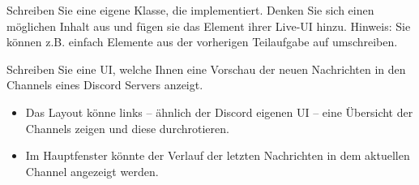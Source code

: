 \documentclass{config/minimal_uebungszettel}
\theoremstyle{definition}
\newcommand{\pp}[1]{\lpl{#1}}
\begin{document}
\begin{aufg}[Rich]
			  \noindent Schreiben Sie eine eigene Klasse, die \pp{__rich__} implementiert. Denken Sie sich einen möglichen Inhalt aus und fügen sie das Element ihrer Live-UI hinzu.\newline
			  Hinweis: Sie können z.B. einfach Elemente aus der vorherigen Teilaufgabe auf \pp{__rich__} umschreiben.
			  
			  	\medskip
			  \medskip
			  
			  \noindent {} \quad
			  
			  \noindent Schreiben Sie eine UI, welche Ihnen eine Vorschau der neuen Nachrichten in den Channels eines Discord Servers anzeigt.
			  \begin{itemize}
			  	\item Das Layout könne links -- ähnlich der Discord eigenen UI -- eine Übersicht der Channels zeigen und diese \glqq durchrotieren\grqq.
			  	\item Im Hauptfenster könnte der Verlauf der letzten Nachrichten in dem aktuellen Channel angezeigt werden.
			  \end{itemize}
			  
			  
			  
		\end{aufg}
	
\end{document}
